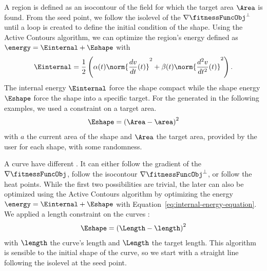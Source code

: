 A region is defined as an isocontour of the field for which the target area $\Area$ is found. From the seed point, we follow the isolevel of the  $\nabla \fitnessFuncObj^\perp$ until a loop is created to define the initial condition of the shape. Using the Active Contours algorithm, we can optimize the region's energy defined as $\energy = \Einternal + \Eshape$ with  
\begin{align}
    \label{eq:internal-energy-equation}
    \Einternal = \frac{1}{2} \left( \alpha(t) \norm{\frac{d v}{d t}(t)}^2 + \beta(t) \norm{\frac{d^2 v}{d t^2}(t)}^2  \right).
\end{align}
The internal energy $\Einternal$ force the shape compact while the shape energy $\Eshape$ force the shape into a specific target. For the  generated in the following examples, we used a constraint on a target area.
\begin{align}
    \label{eq:area-target-equation}
    \Eshape = \left( \Area - \area \right)^2
\end{align}
with $a$ the current area of the shape and $\Area$ the target area, provided by the user for each shape, with some randomness.

A curve have different . It can either follow the gradient of the  $\nabla \fitnessFuncObj$, follow the isocontour $\nabla \fitnessFuncObj^\perp$, or follow the heat points.
While the first two possibilities are trivial, the later can also be optimized using the Active Contours algorithm by optimizing the energy $\energy = \Einternal + \Eshape$ with Equation~\eqref{eq:internal-energy-equation}. We applied a length constraint on the curves : 
\begin{align*}
    \Eshape = \left( \Length - \length \right)^2
\end{align*}
with $\length$ the curve's length and $\Length$ the target length. This algorithm is sensible to the initial shape of the curve, so we start with a straight line following the isolevel at the seed point.


